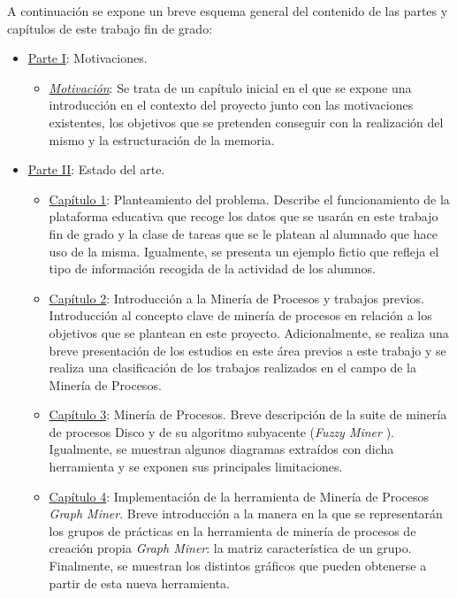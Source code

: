 A continuación se expone un breve esquema general del contenido de las partes y capítulos de este trabajo fin de grado:

\begin{itemize}
\item \hyperref[sec:parteI]{Parte I}: Motivaciones.
\begin{itemize}
\item \hyperref[sec:motivation]{\emph{Motivación}}: Se trata de un capítulo inicial en el que se expone una introducción en el contexto del proyecto junto con las motivaciones existentes, los objetivos que se pretenden conseguir con la realización del mismo y la estructuración de la memoria.
\end{itemize}
\item \hyperref[sec:parteII]{Parte II}: Estado del arte.
\begin{itemize}
\item \hyperref[sec:chapterI]{Capítulo 1}: Planteamiento del problema. Describe el funcionamiento de la plataforma educativa que recoge los datos que se usarán en este trabajo fin de grado y la clase de tareas que se le platean al alumnado que hace uso de la misma. Igualmente, se presenta un ejemplo fictio que refleja el tipo de información recogida de la actividad de los alumnos.
\item \hyperref[sec:chapterII]{Capítulo 2}: Introducción a la Minería de Procesos y trabajos previos. Introducción al concepto clave de minería de procesos en relación a los objetivos que se plantean en este proyecto. Adicionalmente, se realiza una breve presentación de los estudios en este área previos a este trabajo y se realiza una clasificación de los trabajos realizados en el campo de la Minería de Procesos.
\item \hyperref[sec:chapterIII]{Capítulo 3}: Minería de Procesos. Breve descripción de la suite de minería de procesos Disco \cite{gunther2012disco} y de su algoritmo subyacente (\emph{Fuzzy Miner} \cite{gunther2007fuzzy}). Igualmente, se muestran algunos diagramas extraídos con dicha herramienta y se exponen sus principales limitaciones.
\item \hyperref[sec:chapterIV]{Capítulo 4}: Implementación de la herramienta de Minería de Procesos \emph{Graph Miner}. Breve introducción a la manera en la que se representarán los grupos de prácticas en la herramienta de minería de procesos de creación propia \emph{Graph Miner}: la matriz característica de un grupo. Finalmente, se muestran los distintos gráficos que pueden obtenerse a partir de esta nueva herramienta.

\end{itemize}
\end{itemize}
